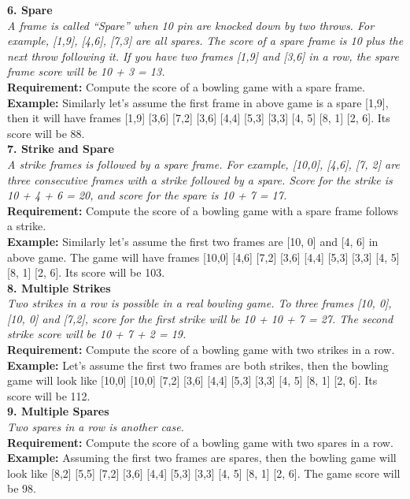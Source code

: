 \noindent \textbf{6. Spare} \\
\textit{A frame is called ``Spare'' when 10 pin are knocked down by two throws. For example, [1,9], [4,6], [7,3] are all spares. The score of a spare frame is 10 plus the next throw following it. If you have two frames [1,9] and [3,6] in a row, the spare frame score will be 10 + 3 = 13.} \\
\textbf{Requirement:} Compute the score of a bowling game with a spare frame. \\
\textbf{Example:} Similarly let's assume the first frame in above game is a spare [1,9], then it will have frames [1,9] [3,6] [7,2] [3,6] [4,4] [5,3] [3,3] [4, 5] [8, 1] [2, 6]. Its score will be 88. \\

\noindent \textbf{7. Strike and Spare} \\
\textit{A strike frames is followed by a spare frame. For example, [10,0], [4,6], [7, 2] are three consecutive frames with a strike followed by a spare. Score for the strike is 10 + 4 + 6 = 20, and score for the spare is 10 + 7 = 17.} \\
\textbf{Requirement:} Compute the score of a bowling game with a spare frame follows a strike. \\
\textbf{Example:} Similarly let's assume the first two frames are [10, 0] and [4, 6] in above game. The game will have frames [10,0] [4,6] [7,2] [3,6] [4,4] [5,3] [3,3] [4, 5] [8, 1] [2, 6]. Its score will be 103. \\

\noindent \textbf{8. Multiple Strikes} \\
\textit{Two strikes in a row is possible in a real bowling game. To three frames [10, 0], [10, 0] and [7,2], score for the first strike will be 10 + 10 + 7 = 27.  The second strike score will be 10 + 7 + 2 = 19.} \\
\textbf{Requirement:} Compute the score of a bowling game with two strikes in a row. \\
\textbf{Example:} Let's assume the first two frames are both strikes, then the bowling game will look like [10,0] [10,0] [7,2] [3,6] [4,4] [5,3] [3,3] [4, 5] [8, 1] [2, 6]. Its score will be 112.  \\

\noindent \textbf{9. Multiple Spares} \\
\textit{Two spares in a row is another case.} \\
\textbf{Requirement:} Compute the score of a bowling game with two spares in a row.\\
\textbf{Example:} Assuming the first two frames are spares, then the bowling game will look like [8,2] [5,5] [7,2] [3,6] [4,4] [5,3] [3,3] [4, 5] [8, 1] [2, 6]. The game score will be 98. \\

